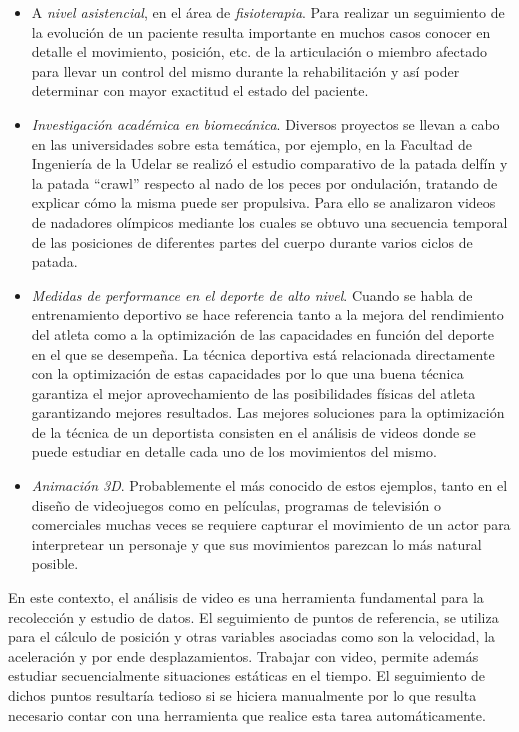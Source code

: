 \begin{itemize}
\item A \emph{nivel asistencial}, en el área de \emph{fisioterapia}. Para realizar un seguimiento de la evolución de un paciente resulta importante en muchos casos conocer en detalle el movimiento, posición, etc. de la articulación o miembro afectado para llevar un control del mismo durante la rehabilitación y así poder determinar con mayor exactitud el estado del paciente.
\item \emph{Investigación académica en biomecánica}. Diversos proyectos se llevan a cabo en las universidades sobre esta temática, por ejemplo, en la Facultad de Ingeniería de la Udelar  se realizó el estudio comparativo de la patada delfín y la patada “crawl” respecto al nado de los peces por ondulación, tratando de explicar cómo la misma puede ser propulsiva. Para ello se analizaron videos de nadadores olímpicos mediante los cuales se obtuvo una secuencia temporal de las posiciones de diferentes partes del cuerpo durante varios ciclos de patada.
\item \emph{Medidas de performance en el deporte de alto nivel}. Cuando se habla de entrenamiento deportivo se hace referencia tanto a la mejora del rendimiento del atleta como a la optimización de las capacidades en función del deporte en el que se desempeña. La técnica deportiva está relacionada directamente con la optimización de estas capacidades por lo que una buena técnica garantiza el mejor aprovechamiento de las posibilidades físicas del atleta garantizando mejores resultados. Las mejores soluciones para la optimización de la técnica de un deportista consisten en el análisis de videos donde se puede estudiar en detalle cada uno de los movimientos del  mismo.
\item \emph{Animación 3D}. Probablemente el más conocido de estos ejemplos, tanto en el diseño de videojuegos como en películas, programas de televisión o comerciales muchas veces se requiere capturar el movimiento de un actor para interpretear un personaje  y que sus movimientos parezcan lo más natural posible.
\end{itemize}

En este contexto, el análisis de video  es  una  herramienta  fundamental para la recolección y estudio de datos. El seguimiento de puntos de referencia, se utiliza para el cálculo de posición y otras variables asociadas como son la velocidad, la aceleración y por ende desplazamientos. Trabajar con video, permite además estudiar secuencialmente situaciones estáticas en el tiempo. El seguimiento de dichos puntos resultaría tedioso si se hiciera manualmente por lo que resulta necesario contar con una herramienta que realice esta tarea automáticamente.

